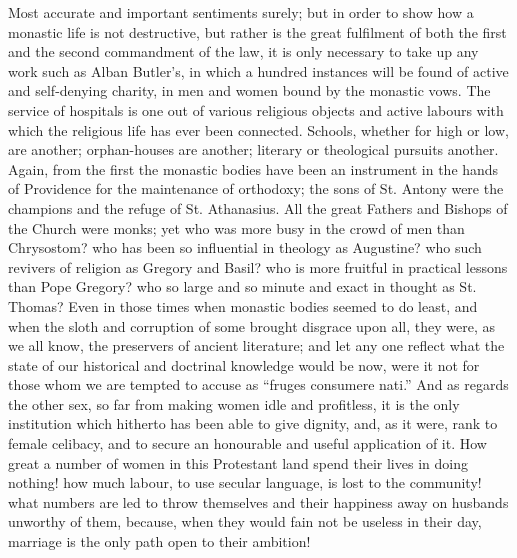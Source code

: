 Most accurate and important sentiments surely;
but in order to show how a monastic life is not destructive, but
rather is the great fulfilment of both the first and the second
commandment of the law, it is only necessary to take up any work such
as Alban Butler's, in which a hundred instances will be found of
active and self-denying charity, in men and women bound by the
monastic vows. The service of hospitals is one out of various
religious objects and active labours with which the religious life has
ever been connected. Schools, whether for high or low, are another;
orphan-houses are another; literary or theological pursuits another.
Again, from the first the monastic bodies have been an instrument in
the hands of Providence for the maintenance of orthodoxy; the sons of
St. Antony were the champions and the refuge of St. Athanasius. All
the great Fathers and Bishops of the Church were monks; yet who was
more busy in the crowd of men than Chrysostom? who has been so
influential in theology as Augustine? who such revivers of religion as
Gregory and Basil? who is more fruitful in practical lessons than Pope
Gregory? who so large and so minute and exact in thought as St.
Thomas? Even in those times when monastic bodies seemed to do least,
and when the sloth and corruption of some brought disgrace upon all,
they were, as we all know, the preservers of ancient literature; and
let any one reflect what the state of our historical and doctrinal
knowledge would be now, were it not for those whom we are tempted to
accuse as ``fruges consumere nati.'' And as regards the other sex,
so far from making women idle and profitless, it is the only
institution which hitherto has been able to give dignity, and, as it
were, rank to female celibacy, and to secure an honourable and useful
application of it. How great a number of women in this Protestant land
spend their lives in doing nothing! how much labour, to use secular
language, is lost to the community! what numbers are led to throw
themselves and their happiness away on husbands unworthy of them,
because, when they would fain not be useless in their day, marriage is
the only path open to their ambition!

